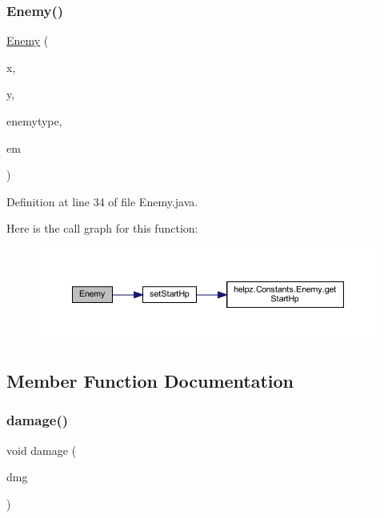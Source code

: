 \subsubsection{\texorpdfstring{Enemy()}{Enemy()}}
{\footnotesize\ttfamily \hyperlink{classenemies_1_1_enemy}{Enemy} (\begin{DoxyParamCaption}\item[{float}]{x,  }\item[{float}]{y,  }\item[{int}]{enemytype,  }\item[{\hyperlink{classmanagers_1_1_enemy_manager}{Enemy\+Manager}}]{em }\end{DoxyParamCaption})}



Definition at line 34 of file Enemy.\+java.

Here is the call graph for this function\+:\nopagebreak
\begin{figure}[H]
\begin{center}
\leavevmode
\includegraphics[width=350pt]{classenemies_1_1_enemy_afa298133293bebcdafef5956df1d1911_cgraph}
\end{center}
\end{figure}


\subsection{Member Function Documentation}
\mbox{\label{classenemies_1_1_enemy_ab316db3306dfd12457e3df71e933ca2d}} 
\subsubsection{\texorpdfstring{damage()}{damage()}}
{\footnotesize\ttfamily void damage (\begin{DoxyParamCaption}\item[{int}]{dmg }\end{DoxyParamCaption})}



